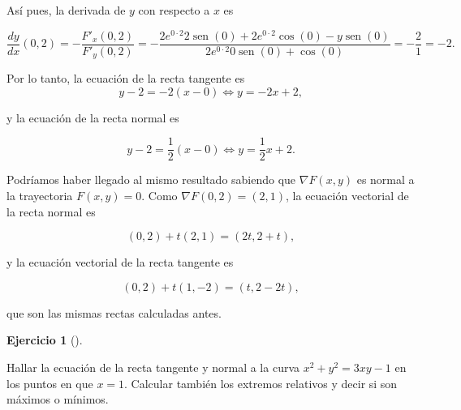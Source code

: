 \documentclass[
  a4paper,
]{scrreport}
\theoremstyle{definition}
\newtheorem{exercise}{Ejercicio}[chapter]
\theoremstyle{remark}
\begin{document}
\begin{tcolorbox}
Así pues, la derivada de \(y\) con respecto a \(x\) es

\[
\frac{dy}{dx} (0,2)
= -\frac{F'_x(0,2)}{F'_y(0,2)} 
= -\frac{2e^{0\cdot 2}2 \operatorname{sen}(0) + 2e^{0\cdot 2} \cos(0) - y \operatorname{sen}(0)}{2e^{0\cdot 2}0 \operatorname{sen}(0) + \cos(0)}
= -\frac{2}{1} 
= -2.
\]

Por lo tanto, la ecuación de la recta tangente es \[
y-2 = -2(x-0) \Leftrightarrow y = -2x+2,
\]

y la ecuación de la recta normal es

\[
y-2 = \frac{1}{2}(x-0) \Leftrightarrow y = \frac{1}{2}x+2.
\]

Podríamos haber llegado al mismo resultado sabiendo que
\(\nabla F(x,y)\) es normal a la trayectoria \(F(x,y)=0\). Como
\(\nabla F(0,2) = (2,1)\), la ecuación vectorial de la recta normal es

\[
(0, 2) + t (2, 1) = (2t, 2+t),
\]

y la ecuación vectorial de la recta tangente es

\[
(0, 2) + t (1, -2) = (t, 2-2t),
\]

que son las mismas rectas calculadas antes.

\end{tcolorbox}

\begin{exercise}[]\protect\hypertarget{exr-derivada-implicita-trayectoria-extremos}{}\label{exr-derivada-implicita-trayectoria-extremos}

Hallar la ecuación de la recta tangente y normal a la curva
\(x^2+y^2=3xy-1\) en los puntos en que \(x=1\). Calcular también los
extremos relativos y decir si son máximos o mínimos.

\end{exercise}
\end{document}
